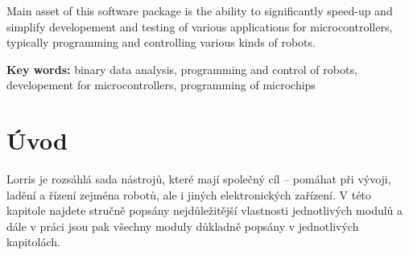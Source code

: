 \documentclass[12pt, a4paper, oneside]{article}
\newcommand{\D}{\medskip \noindent} %
\newcommand{\B}{\textbf} %
\begin{document}
Main asset of this software package is the ability to significantly speed-up and simplify developement and testing of various applications for microcontrollers, typically programming and controlling various kinds of robots.

\D \B{Key words:} binary data analysis, programming and control of robots, developement for microcontrollers, programming of microchips

\addtolength{\textheight}{30mm} %

\newpage
\pagestyle{plain}

\setlength{\voffset}{-20mm} %
\setcounter{page}{1}  %

\tableofcontents  %

\addtolength{\textheight}{-30mm} %
\newpage
\setlength{\voffset}{0mm} %
\pagestyle{plain}

\section*{Úvod}
\label{uvod}
Lorris je rozsáhlá sada nástrojů, které mají společný cíl -- pomáhat při vývoji, ladění a řízení zejména robotů, ale i jiných elektronických zařízení. V této kapitole najdete stručně popsány nejdůležitější vlastnosti jednotlivých modulů a dále v práci jsou pak všechny moduly důkladně popsány v jednotlivých kapitolách.
\end{document}
